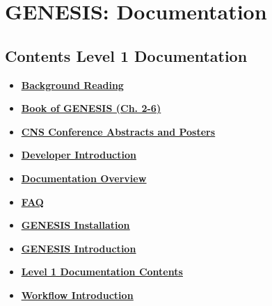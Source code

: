 \documentclass[12pt]{article}
\begin{document}
\section*{GENESIS: Documentation}

\subsection*{Contents Level 1 Documentation}

\begin{itemize}

\item \href{../background-material/background-material.pdf}{\bf \underline{Background Reading}}

\item \href{../book-of-genesis/book-of-genesis.pdf}{\bf \underline{Book of GENESIS (Ch. 2-6)}}

\item \href{../cns/cns.pdf}{\bf \underline{CNS Conference Abstracts and Posters}}

\item \href{../developer-intro/developer-intro.pdf}{\bf \underline{Developer Introduction}}

\item \href{../documentation-overview/documentation-overview.pdf}{\bf \underline{Documentation Overview}}

\item \href{../faq/faq.pdf}{\bf \underline{FAQ}}

\item \href{../genesis-installation/genesis-installation.pdf}{\bf \underline{GENESIS Installation}}

\item \href{../genesis-intro/genesis-intro.pdf}{\bf \underline{GENESIS Introduction}}

\item \href{../contents-level1/contents-level1.pdf}{\bf \underline{Level 1 Documentation Contents}}

\item \href{../workflow-intro/workflow-intro.pdf}{\bf \underline{Workflow Introduction}}


\end{itemize}

\end{document}
